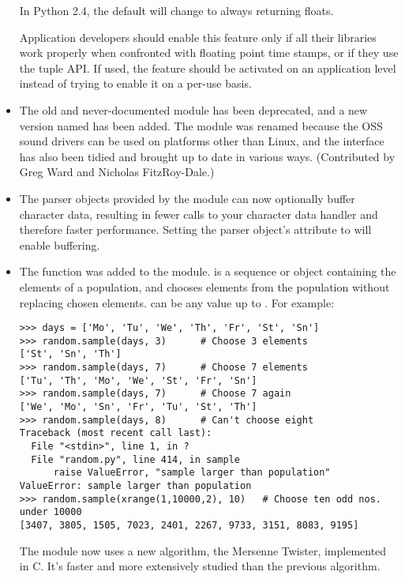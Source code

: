 \documentclass{howto}
\begin{document}
\begin{itemize}
In Python 2.4, the default will change to always returning floats.

Application developers should enable this feature only if all their
libraries work properly when confronted with floating point time
stamps, or if they use the tuple API. If used, the feature should be
activated on an application level instead of trying to enable it on a
per-use basis.

\item The old and never-documented  module has
been deprecated, and a new version named  has been
added.  The module was renamed because the OSS sound drivers can be
used on platforms other than Linux, and the interface has also been
tidied and brought up to date in various ways. (Contributed by Greg
Ward and Nicholas FitzRoy-Dale.)

\item The parser objects provided by the  module
can now optionally buffer character data, resulting in fewer calls to
your character data handler and therefore faster performance.  Setting
the parser object's  attribute to 
will enable buffering.

\item The  function was
added to the  module.   is a sequence
or  object containing the elements of a population, and
chooses  elements from the population without replacing chosen
elements.   can be any value up to .
For example:

\begin{verbatim}
>>> days = ['Mo', 'Tu', 'We', 'Th', 'Fr', 'St', 'Sn']
>>> random.sample(days, 3)      # Choose 3 elements
['St', 'Sn', 'Th']
>>> random.sample(days, 7)      # Choose 7 elements
['Tu', 'Th', 'Mo', 'We', 'St', 'Fr', 'Sn']
>>> random.sample(days, 7)      # Choose 7 again
['We', 'Mo', 'Sn', 'Fr', 'Tu', 'St', 'Th']
>>> random.sample(days, 8)      # Can't choose eight
Traceback (most recent call last):
  File "<stdin>", line 1, in ?
  File "random.py", line 414, in sample
      raise ValueError, "sample larger than population"
ValueError: sample larger than population
>>> random.sample(xrange(1,10000,2), 10)   # Choose ten odd nos. under 10000
[3407, 3805, 1505, 7023, 2401, 2267, 9733, 3151, 8083, 9195]
\end{verbatim}

The  module now uses a new algorithm, the Mersenne
Twister, implemented in C.  It's faster and more extensively studied
than the previous algorithm.


\end{itemize}
\end{document}
